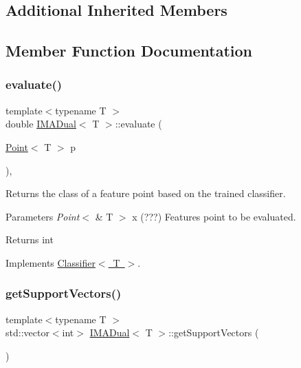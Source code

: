 \subsection*{Additional Inherited Members}


\subsection{Member Function Documentation}
\mbox{\label{class_i_m_a_dual_af67dfc75554d055cfdf761ee940243d7}} 
\subsubsection{\texorpdfstring{evaluate()}{evaluate()}}
{\footnotesize\ttfamily template$<$typename T $>$ \\
double \mbox{\hyperlink{class_i_m_a_dual}{I\+M\+A\+Dual}}$<$ T $>$\+::evaluate (\begin{DoxyParamCaption}\item[{\mbox{\hyperlink{class_point}{Point}}$<$ T $>$}]{p }\end{DoxyParamCaption})\hspace{0.3cm}{\ttfamily [override]}, {\ttfamily [virtual]}}



Returns the class of a feature point based on the trained classifier. 


\begin{DoxyParams}{Parameters}
{\em Point$<$} & T $>$ x (???) Features point to be evaluated. \\
\hline
\end{DoxyParams}
\begin{DoxyReturn}{Returns}
int 
\end{DoxyReturn}


Implements \mbox{\hyperlink{class_classifier_ab3b9544a8d9c3cbde8d5865c7e9be0fb}{Classifier$<$ T $>$}}.

\mbox{\label{class_i_m_a_dual_aa8e4e1d6e34c2e67d752c6b5f111ce35}} 
\subsubsection{\texorpdfstring{get\+Support\+Vectors()}{getSupportVectors()}}
{\footnotesize\ttfamily template$<$typename T $>$ \\
std\+::vector$<$int$>$ \mbox{\hyperlink{class_i_m_a_dual}{I\+M\+A\+Dual}}$<$ T $>$\+::get\+Support\+Vectors (\begin{DoxyParamCaption}{ }\end{DoxyParamCaption})\hspace{0.3cm}{\ttfamily [inline]}}



